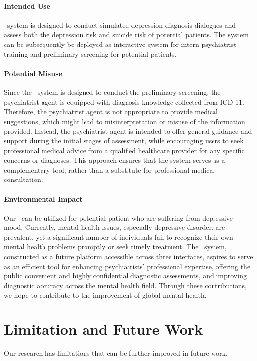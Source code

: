     \paragraph{Intended Use}
    \system~system is designed to conduct simulated depression diagnosis dialogues and assess both the depression risk and suicide risk of potential patients. The system can be subsequently be deployed as interactive system for intern psychiatrist training and preliminary screening for potential patients.

    \paragraph{Potential Misuse}
    Since the \system~system is designed to conduct the preliminary screening, the psychiatrist agent is equipped with diagnosis knowledge collected from ICD-11. Therefore, the psychiatrist agent is not appropriate to provide medical suggestions, which might lead to misinterpretation or misuse of the information provided. Instead, the psychiatrist agent is intended to offer general guidance and support during the initial stages of assessment, while encouraging users to seek professional medical advice from a qualified healthcare provider for any specific concerns or diagnoses. This approach ensures that the system serves as a complementary tool, rather than a substitute for professional medical consultation.

    \paragraph{Environmental Impact}
    Our \system~can be utilized for potential patient who are suffering from depressive mood. Currently, mental health issues, especially depressive disorder, are prevalent, yet a significant number of individuals fail to recognize their own mental health problems promptly or seek timely treatment. The \system~system, constructed as a future platform accessible across three interfaces, aspires to serve as an efficient tool for enhancing psychiatrists' professional expertise, offering the public convenient and highly confidential diagnostic assessments, and improving diagnostic accuracy across the mental health field. Through these contributions, we hope to contribute to the improvement of global mental health.

\section{Limitation and Future Work}
Our research has limitations that can be further improved in future work.

